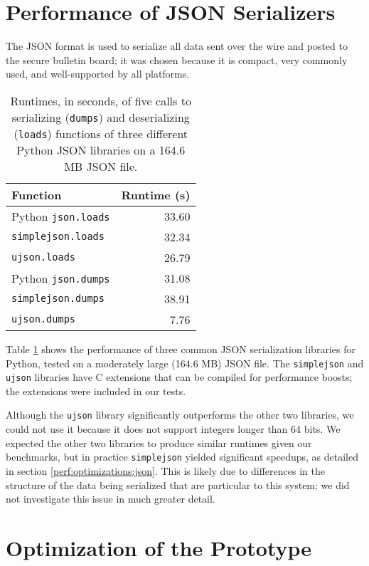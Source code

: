 \section{Performance of JSON Serializers} \label{perf:json}

The JSON format is used to serialize all data sent over the wire and posted to the secure bulletin board; it was chosen because it is compact, very commonly used, and well-supported by all platforms.

\begin{table}[htbp]
\centering
\begin{tabular}{l | r}
  \textbf{Function} & \textbf{Runtime (s)} \\
  \hline
  Python \texttt{json.loads} & 33.60 \\
  \texttt{simplejson.loads} & 32.34 \\
  \texttt{ujson.loads} & 26.79 \\
  \hline
  Python \texttt{json.dumps} & 31.08 \\
  \texttt{simplejson.dumps} & 38.91 \\
  \texttt{ujson.dumps} & 7.76
\end{tabular}
\caption[Performance measurements of JSON serializers]{Runtimes, in seconds, of five calls to serializing (\texttt{dumps}) and deserializing (\texttt{loads}) functions of three different Python JSON libraries on a 164.6 MB JSON file.}
\label{table:perf:json}
\end{table}

Table \ref{table:perf:json} shows the performance of three common JSON serialization libraries for Python, tested on a moderately large (164.6 MB) JSON file. The \texttt{simplejson} and \texttt{ujson} libraries have C extensions that can be compiled for performance boosts; the extensions were included in our tests.

Although the \texttt{ujson} library significantly outperforms the other two libraries, we could not use it because it does not support integers longer than 64 bits. We expected the other two libraries to produce similar runtimes given our benchmarks, but in practice \texttt{simplejson} yielded significant speedups, as detailed in section \ref{perf:optimizations:json}. This is likely due to differences in the structure of the data being serialized that are particular to this system; we did not investigate this issue in much greater detail.

\section{Optimization of the Prototype} \label{perf:optimizations}

